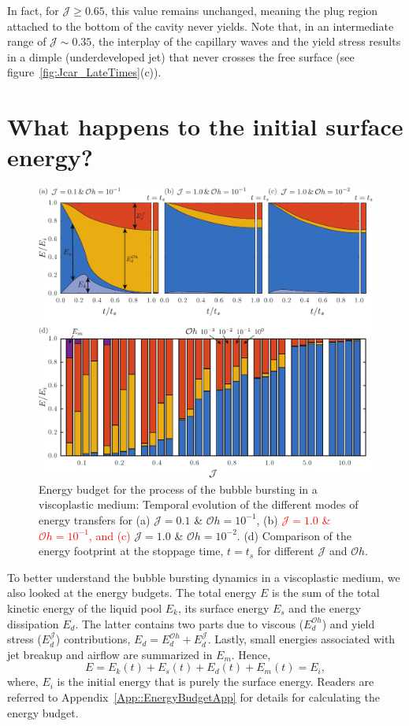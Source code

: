 \documentclass[final]{jfm}
\newcommand*\red{\textcolor{red}}
\begin{document}
In fact, for $\mathcal{J} \ge 0.65$, this value remains unchanged, meaning the plug region attached to the bottom of the cavity never yields. Note that, in an intermediate range of $\mathcal{J} \sim 0.35$, the interplay of the capillary waves and the yield stress results in a dimple (underdeveloped jet) that never crosses the free surface (see figure~\ref{fig:Jcar_LateTimes}(c)). 

\section{What happens to the initial surface energy?}\label{Sec::Energy}
\begin{figure}
	\centerline{\includegraphics[width=\linewidth]{Figure5-EnergyBudgets-eps-converted-to.pdf}}%
	\caption{Energy budget for the process of the bubble bursting in a viscoplastic medium: Temporal evolution of the different modes of energy transfers for (a) $\mathcal{J} =0.1$ \& $\mathcal{O}h =10^{-1}$, (b) \red{$\mathcal{J} = 1.0$ \& $\mathcal{O}h =10^{-1}$, and (c)} $\mathcal{J} =1.0$ \& $\mathcal{O}h =10^{-2}$. (d) Comparison of the energy footprint at the stoppage time, $t = t_s$ for different $\mathcal{J}$ and $\mathcal{O}h$.}
	\label{fig:EnergyBudget}
\end{figure}
To better understand the bubble bursting dynamics in a viscoplastic medium, we also looked at the energy budgets. The total energy $E$ is the sum of the total kinetic energy of the liquid pool $E_k$, its surface energy $E_s$ and the energy dissipation $E_d$. The latter contains two parts due to viscous ($E_d^{\mathcal{O}h}$) and yield stress ($E_d^\mathcal{J}$) contributions, $E_d = E_d^{\mathcal{O}h} +E_d^\mathcal{J}$. Lastly, small energies associated with jet breakup and airflow are summarized in $E_m$. Hence,
\begin{equation}\label{Eqn::ETotal}
E = E_k(t) + E_s(t) + E_d(t) + E_m(t) = E_i,
\end{equation}
where, $E_i$ is the initial energy that is purely the surface energy. Readers are referred to Appendix~\ref{App::EnergyBudgetApp} for details for calculating the energy budget. 
\end{document}

